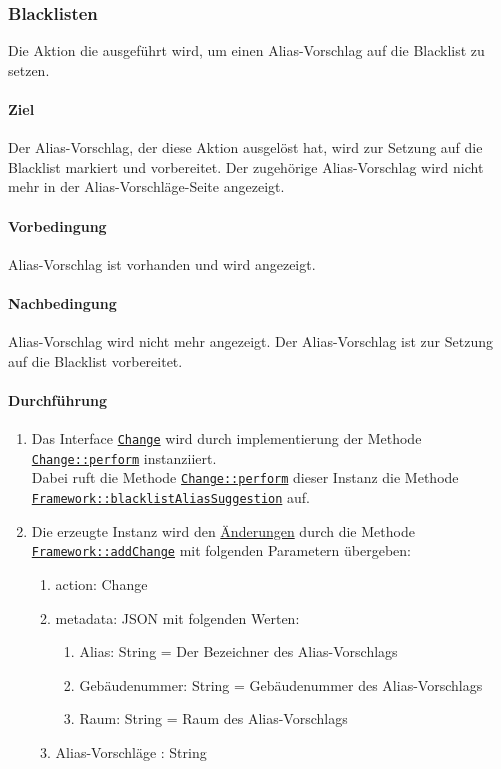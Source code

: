 \newpage
\subsubsection{Blacklisten}\label{AP_Aktionen_Alias_Vorschlage_Blacklisten}

Die Aktion die ausgeführt wird, um einen Alias-Vorschlag auf die Blacklist zu setzen.

\paragraph*{Ziel}
Der Alias-Vorschlag, der diese Aktion ausgelöst hat, wird zur Setzung auf die Blacklist markiert und vorbereitet.
Der zugehörige Alias-Vorschlag wird nicht mehr in der Alias-Vorschläge-Seite angezeigt.

\paragraph*{Vorbedingung}
Alias-Vorschlag ist vorhanden und wird angezeigt.

\paragraph*{Nachbedingung}
Alias-Vorschlag wird nicht mehr angezeigt. Der Alias-Vorschlag ist zur Setzung auf die Blacklist vorbereitet.

\paragraph*{Durchführung}
\begin{enumerate}
    \item Das Interface \hyperref[AP_Change]{\texttt{Change}} wird durch implementierung der Methode \hyperref[AP_Change_perform]{\texttt{Change::perform}} instanziiert. \\
          Dabei ruft die Methode \hyperref[AP_Change_perform]{\texttt{Change::perform}} dieser Instanz die Methode \\
          \hyperref[AP_Framework_blacklistAliasSuggestion]{\texttt{Framework::blacklistAliasSuggestion}} auf.
    \item Die erzeugte Instanz wird den \hyperref[AP_Changes]{Änderungen} durch die Methode \hyperref[AP_Framework_addChange]{\texttt{Framework::addChange}} mit folgenden Parametern übergeben: \begin{enumerate}
        \item action: Change
        \item metadata: JSON mit folgenden Werten: \begin{enumerate}
            \item Alias: String = Der Bezeichner des Alias-Vorschlags
            \item Gebäudenummer: String = Gebäudenummer des Alias-Vorschlags
            \item Raum: String = Raum des Alias-Vorschlags
        \end{enumerate}
        \item \dq Alias-Vorschläge \dq: String
    \end{enumerate}
\end{enumerate}